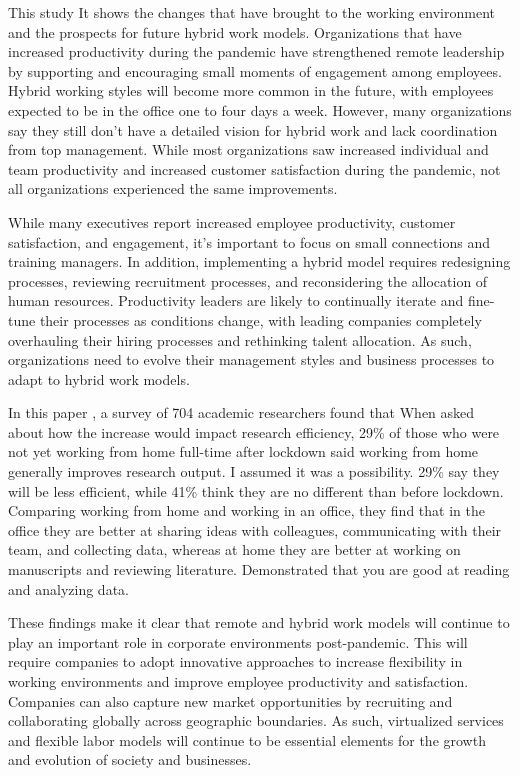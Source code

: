 \documentclass[12pt]{article}
\begin{document}
This study \cite{what_executives_say} It shows the changes that have brought to
the working
environment and the
prospects for future hybrid work models. Organizations that have increased
productivity during the pandemic have strengthened remote leadership by
supporting and encouraging small moments of engagement among employees. Hybrid
working styles will become more common in the future, with employees expected
to be in the office one to four days a week. However, many organizations say
they still don't have a detailed vision for hybrid work and lack coordination
from top management. While most organizations saw increased individual and team
productivity and increased customer satisfaction during the pandemic, not all
organizations experienced the same improvements.

While many executives report increased employee productivity, customer
satisfaction, and engagement, it's important to focus on small connections and
training managers. In addition, implementing a hybrid model requires
redesigning processes, reviewing recruitment processes, and reconsidering the
allocation of human resources. Productivity leaders are likely to continually
iterate and fine-tune their processes as conditions change, with leading
companies completely overhauling their hiring processes and rethinking talent
allocation. As such, organizations need to evolve their management styles and
business processes to adapt to hybrid work models.

In this paper \cite{10.1371/journal.pone.0249127}, a survey of 704 academic
researchers found that
When asked about how the increase
would impact research efficiency, 29\% of those who were not yet working from
home full-time after lockdown said working from home generally improves
research output. I assumed it was a possibility. 29\% say they will be less
efficient, while 41\% think they are no different than before lockdown.
Comparing working from home and working in an office, they find that in the
office they are better at sharing ideas with colleagues, communicating with
their team, and collecting data, whereas at home they are better at working on
manuscripts and reviewing literature. Demonstrated that you are good at reading
and analyzing data.

These findings make it clear that remote and hybrid work models will continue
to play an important role in corporate environments post-pandemic. This will
require companies to adopt innovative approaches to increase flexibility in
working environments and improve employee productivity and satisfaction.
Companies can also capture new market opportunities by recruiting and
collaborating globally across geographic boundaries. As such, virtualized
services and flexible labor models will continue to be essential elements for
the growth and evolution of society and businesses.
\end{document}

